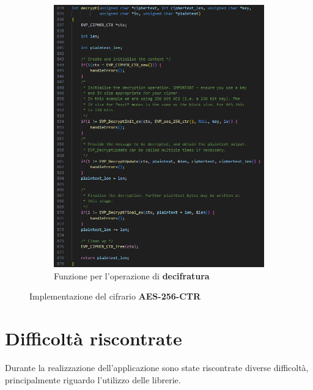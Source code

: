 \begin{figure}[h]
\begin{subfigure}{0.45\textwidth}
        \includegraphics[width=1\textwidth]{capitoli/figure-implementazione/aes-decrypt.png}
        \caption{Funzione per l'operazione di \textbf{decifratura}}
        \label{fig:aes-decrypt}
    \end{subfigure}
    \caption{Implementazione del cifrario \textbf{AES-256-CTR}}
    \label{fig:aes-functions}
\end{figure}

\section{Difficoltà riscontrate}
Durante la realizzazione dell'applicazione sono state riscontrate diverse difficoltà, principalmente riguardo l'utilizzo delle librerie.
